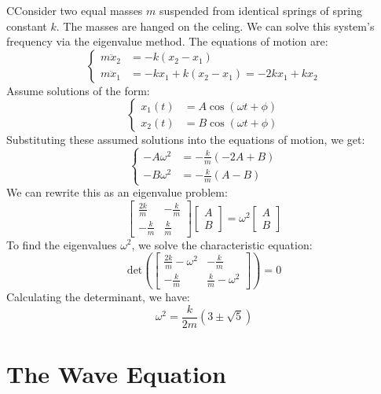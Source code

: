 \documentclass[11pt]{report}
\begin{document}
\begin{example}
    CConsider two equal masses $m$ suspended from identical springs of spring constant $k$. The masses are hanged on the celing. We can solve this system's frequency via the eigenvalue method. The equations of motion are:
    $$
        \begin{cases}
            m\ddot{x}_2 &= -k(x_2 - x_1)\\
            m\ddot{x}_1 &= -k x_1 + k(x_2 - x_1) = -2k x_1 + k x_2
        \end{cases}
    $$
    Assume solutions of the form:
    $$        
    \begin{cases}
            x_1(t) &= A \cos(\omega t + \phi) \\
            x_2(t) &= B \cos(\omega t + \phi)
        \end{cases}
    $$
    Substituting these assumed solutions into the equations of motion, we get:
    $$
        \begin{cases}
            -A \omega^2 &= -\frac{k}{m}(-2A + B) \\
            -B \omega^2 &= -\frac{k}{m}(A - B)
        \end{cases}
    $$
    We can rewrite this as an eigenvalue problem:
    $$
        \begin{bmatrix}
            \frac{2k}{m} & -\frac{k}{m} \\
            -\frac{k}{m} & \frac{k}{m}
        \end{bmatrix}
        \begin{bmatrix}
            A \\ B
        \end{bmatrix}
        = \omega^2
        \begin{bmatrix}
            A \\ B
        \end{bmatrix}
    $$
    To find the eigenvalues \( \omega^2 \), we solve the characteristic equation:
    $$
        \text{det}\left(\begin{bmatrix}
            \frac{2k}{m} - \omega^2 & -\frac{k}{m} \\
            -\frac{k}{m} & \frac{k}{m} - \omega^2
        \end{bmatrix}\right) = 0
    $$
    Calculating the determinant, we have:
    $$
        \omega^2 = \frac{k}{2m}(3\pm \sqrt{5})
    $$
\end{example}

\section{The Wave Equation}
\end{document}
